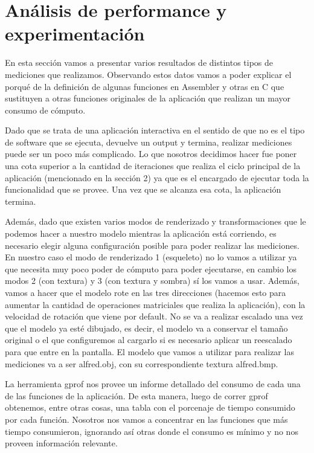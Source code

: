 \documentclass[a4paper]{article}
\begin{document}
\section{Análisis de performance y experimentación}
En esta sección vamos a presentar varios resultados de distintos tipos de mediciones que realizamos. Observando estos datos vamos a poder explicar el porqué de la definición de algunas funciones en Assembler y otras en C que sustituyen a otras funciones originales de la aplicación que realizan un mayor consumo de cómputo.

Dado que se trata de una aplicación interactiva en el sentido de que no es el tipo de software que se ejecuta, devuelve un output y termina, realizar mediciones puede ser un poco más complicado. Lo que nosotros decidimos hacer fue poner una cota superior a la cantidad de iteraciones que realiza el ciclo principal de la aplicación (mencionado en la sección 2) ya que es el encargado de ejecutar toda la funcionalidad que se provee. Una vez que se alcanza esa cota, la aplicación termina.

Además, dado que existen varios modos de renderizado y transformaciones que le podemos hacer a nuestro modelo mientras la aplicación está corriendo, es necesario elegir alguna configuración posible para poder realizar las mediciones. En nuestro caso el modo de renderizado 1 (esqueleto) no lo vamos a utilizar ya que necesita muy poco poder de cómputo para poder ejecutarse, en cambio los modos 2 (con textura) y 3 (con textura y sombra) sí los vamos a usar. Además, vamos a hacer que el modelo rote en las tres direcciones (hacemos esto para aumentar la cantidad de operaciones matriciales que realiza la aplicación), con la velocidad de rotación que viene por default. No se va a realizar escalado una vez que el modelo ya esté dibujado, es decir, el modelo va a conservar el tamaño original o el que configuremos al cargarlo si es necesario aplicar un reescalado para que entre en la pantalla. El modelo que vamos a utilizar para realizar las mediciones va a ser alfred.obj, con su correspondiente textura alfred.bmp.

La herramienta gprof nos provee un informe detallado del consumo de cada una de las funciones de la aplicación. De esta manera, luego de correr gprof obtenemos, entre otras cosas, una tabla con el porcenaje de tiempo consumido por cada función. Nosotros nos vamos a concentrar en las funciones que más tiempo consumieron, ignorando así otras donde el consumo es mínimo y no nos proveen información relevante.
\end{document}
